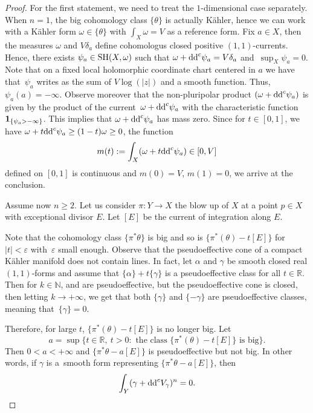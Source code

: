 \documentclass[11pt]{article}
\numberwithin{equation}{section}
\numberwithin{equation}{section}
\theoremstyle{plain}
\newcommand{\N}{\mathbb N}
\newcommand \SH {{\rm SH}}
\begin{document}
\begin{proof} For the first statement, we need to treat the $1$-dimensional case separately. When $n=1$, the big cohomology class $\{\theta\}$ is actually K\"ahler, hence we can work with a K\"ahler form $\omega\in \{\theta\}$ with $\int_X \omega = V$ as a reference form.
Fix $a\in X$, then the measures $\omega$ and $V \delta_a$ define cohomologus closed positive $(1,1)$-currents. Hence, there exists $\psi_a \in \SH(X,\omega)$ such that $\omega + {\rm dd}^c \psi_a = V \delta_a$ and~$\sup_X \psi_a = 0$.
Note that on a fixed local holomorphic coordinate chart centered in $a$ we have that~$\psi_a $ writes as the sum of $ V \log(|z|)$ and a smooth function. Thus, $ \psi_a(a) = - \infty$. Observe moreover that the non-pluripolar product $( \omega + {\rm dd}^c \psi_a)$ is given by the product of the current~${\omega + {\rm dd}^c \psi_a}$ with the characteristic function $ {\bf 1}_{ \{ \psi_a > - \infty \} }$. This implies that $\omega + {\rm dd}^c \psi_a$ has mass zero. Since for $t \in [0,1]$, we have $ \omega +t {\rm dd}^c \psi_a \geq (1-t) \omega \geq 0$, the function
\[m(t):= \int_X (\omega+t{\rm dd}^c\psi_a)\in [0, V]\]
 defined on $[0,1]$ is continuous and $m(0)=V$, $m(1)=0$, we arrive at the conclusion.

Assume now $n\geq 2$. Let us consider $\pi \colon Y \to X$ the blow up of $X$ at a point $p \in X$ with exceptional divisor $E$. Let $[E]$ be the current of integration along $E$.

Note that the cohomology class $\{ \pi^*\theta \} $ is big and so is $\{\pi^*(\theta) - t [E]\}$ for $ |t| < \varepsilon$ with~$\varepsilon$ small enough.
Observe that the pseudoeffective cone of a compact K\"ahler manifold does not contain lines. In fact, let $\alpha $ and $\gamma$ be smooth closed real $(1,1)$-forms and assume that
${\{ \alpha \} + t \{ \gamma \}}$ is a pseudoeffective class for all
$t \in \mathbb{R}$.
Then for $k \in { \N}$,  and  are pseudoeffective, but the pseudoeffective cone is closed, then letting $k\rightarrow +\infty$, we get that both
$\{ \gamma \}$ and $\{ - \gamma \} $ are pseudoeffective classes, meaning that~${\{ \gamma \} = 0}$.

Therefore, for large $t$, $\{\pi^*(\theta) - t [E] \}$ is no longer big. Let
\[a = \sup \{ t \in \mathbb{R}, \ t > 0 \colon \mbox{ the class $\{ \pi^*(\theta) - t[E] \}$ is big} \}.
\]
Then $ 0< a < +\infty $ and
$\{\pi^*\theta - a [E]\}$ is pseudoeffective but not big.
In other words, if $\gamma$ is a~smooth form representing
$\{ \pi^*\theta - a [E] \}$, then
\[\int_Y (\gamma+{\rm dd}^c V_\gamma)^n = 0. \]


\end{proof}
\end{document}
